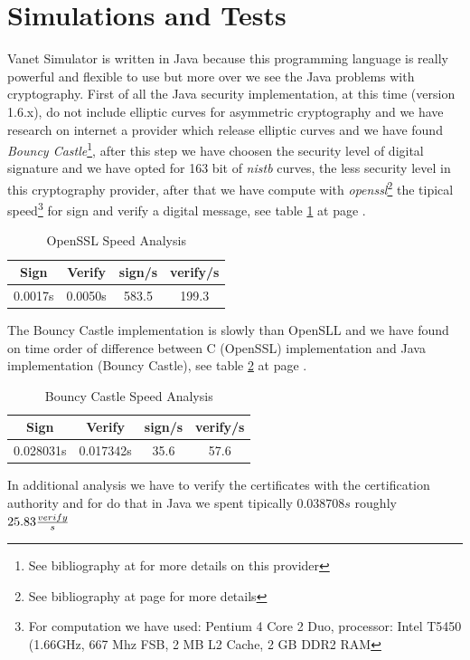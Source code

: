 \section{Simulations and Tests}
Vanet Simulator is written in Java because this programming language is really powerful and flexible to use but more over we see the Java problems with cryptography. First of all the Java security implementation, at this time (version 1.6.x), do not include elliptic curves for asymmetric cryptography and we have research on internet a provider which release elliptic curves and we have found \textit{Bouncy Castle}\footnote{See bibliography at \pageref{bibliography} for more details on this provider}, after this step we have choosen the security level of digital signature and we have opted for 163 bit of \textit{nistb} curves, the less security level in this cryptography provider, after that we have compute with \emph{openssl}\footnote{See bibliography at page \pageref{bibliography} for more details} the tipical speed\footnote{For computation we have used: Pentium 4 Core 2 Duo, processor: Intel T5450 (1.66GHz, 667 Mhz FSB, 2 MB L2 Cache, 2 GB DDR2 RAM} for sign and verify a digital message, see table \ref{tab:OpensslVelocity} at page \pageref{tab:OpensslVelocity}.
\begin{table}[!ht]
	\centering
	\caption{OpenSSL Speed Analysis}
	\begin{tabular}{|c|c|c|c|}
	\hline\hline 
	\textbf{Sign} & \textbf{Verify} & \textbf{sign/s} & \textbf{verify/s} \\
	\hline
	0.0017s & 0.0050s & 583.5 & 199.3 \\
	\hline
	\hline     %
 	\end{tabular} 
	\label{tab:OpensslVelocity}
\end{table}
The Bouncy Castle implementation is slowly than OpenSLL and we have found on time order of difference between C (OpenSSL)  implementation and Java implementation (Bouncy Castle), see table \ref{tab:BouncyCastleVelocity} at page \pageref{tab:BouncyCastleVelocity}.
\begin{table}[!ht]
	\centering
	\caption{Bouncy Castle Speed Analysis}
	\begin{tabular}{|c|c|c|c|}
	\hline\hline 
	\textbf{Sign} & \textbf{Verify} & \textbf{sign/s} & \textbf{verify/s} \\
	\hline
	0.028031s & 0.017342s & 35.6 & 57.6 \\
	\hline
	\hline     %
 	\end{tabular} 
	\label{tab:BouncyCastleVelocity}
\end{table}
In additional analysis we have to verify the certificates with the certification authority and for do that in Java we spent tipically $0.038708s$ roughly $25.83 {verify \over s}$

